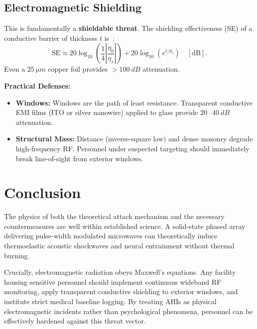 \documentclass[aps,prl,twocolumn,superscriptaddress,showpacs]{revtex4-2}
\begin{document}
\subsection{Electromagnetic Shielding}

This is fundamentally a \textbf{shieldable threat}. The shielding effectiveness (SE) of a conductive barrier of thickness $t$ is~\cite{Ott2009}:
\begin{equation}
\text{SE} \approx 20 \log_{10}\!\left(\frac{1}{4}
\left|\frac{\eta_0}{\eta_s}\right|\right)
+ 20\log_{10}(e^{t/\delta_s}) \quad [\text{dB}].
\label{eq:shielding}
\end{equation}
Even a $\SI{25}{\micro m}$ copper foil provides $> \SI{100}{dB}$ attenuation.

\textbf{Practical Defenses:}
\begin{itemize}
  \item \textbf{Windows:} Windows are the path of least resistance. Transparent conductive EMI films (ITO or silver nanowire) applied to glass provide $\SI{20}{}$--$\SI{40}{dB}$ attenuation.
  \item \textbf{Structural Mass:} Distance (inverse-square law) and dense masonry degrade high-frequency RF. Personnel under suspected targeting should immediately break line-of-sight from exterior windows.
\end{itemize}

\section{Conclusion}
\label{sec:conclusion}

The physics of both the theoretical attack mechanism and the necessary countermeasures are well within established science. A solid-state phased array delivering pulse-width modulated microwaves can theoretically induce thermoelastic acoustic shockwaves and neural entrainment without thermal burning.

Crucially, electromagnetic radiation obeys Maxwell's equations. Any facility housing sensitive personnel should implement continuous wideband RF monitoring, apply transparent conductive shielding to exterior windows, and institute strict medical baseline logging. By treating AHIs as physical electromagnetic incidents rather than psychological phenomena, personnel can be effectively hardened against this threat vector.
\end{document}

